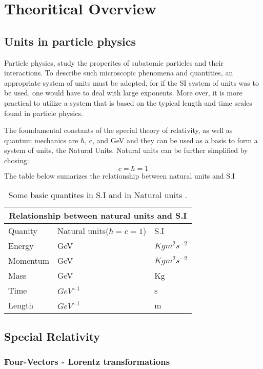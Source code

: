 
\section{Theoritical Overview}
\label{sec:org2ae82f1}
\subsection{Units in particle physics}
\label{sec:org2338bc0}
Particle physics, study the properites of subatomic particles and their interactions. To describe such microscopic phenomena and quantities, an appropriate system of units must be adopted, for if the SI system of units was to be used, one would have to deal with large exponents. More over, it is more practical to utilize a system that is based on the typical length and time scales found in particle physics\cite{thomson_2013}.

The foundamental constants of the special theory of relativity, as well as quantum mechanics are \(\hbar\), c, and  GeV and they can be used as a basis to form a system of units, the Natural Units. Natural units can be further simplified by chosing:
\[ c = \hbar = 1\]
The table below sumarizes the relationship between natural units and S.I

\begin{table}[h!]
\centering
\begin{tabular}{ |p{3cm}|p{4cm}|p{3cm}|  }
 \hline
 \multicolumn{3}{|c|}{Relationship between natural units and S.I} \\
 \hline
 \hline
Quanity & Natural units($ \hbar = c = 1 $) & S.I \\
 \hline
Energy & GeV & $Kg m^{2}s^{-2}$ \\
Momentum & GeV& $ Kg m^{2}s^{-2}$ \\
Mass & GeV & Kg\\
Time & $GeV^{-1}$ & s\\
Length & $GeV^{-1}$ & m\\
 \hline
\end{tabular}
\caption{Some basic quantites in S.I and in Natural units .}
\label{table:natural_units}
\end{table}

\subsection{Special Relativity}
\label{sec:orgd8ae263}

\subsubsection{Four-Vectors - Lorentz transformations}
\label{sec:orgec107fd}


